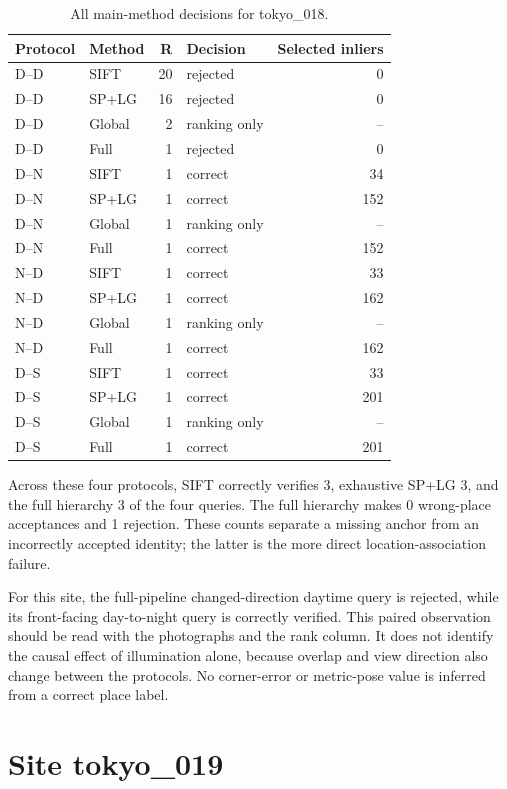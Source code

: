 \begin{table}[H]\centering\small
\caption{All main-method decisions for tokyo\_018.}\label{tab:tokyo-site-18}
\begin{tabular}{llrlr}\toprule
Protocol & Method & R & Decision & Selected inliers \\
\midrule
D--D & SIFT & 20 & rejected & 0 \\
D--D & SP+LG & 16 & rejected & 0 \\
D--D & Global & 2 & ranking only & -- \\
D--D & Full & 1 & rejected & 0 \\
D--N & SIFT & 1 & correct & 34 \\
D--N & SP+LG & 1 & correct & 152 \\
D--N & Global & 1 & ranking only & -- \\
D--N & Full & 1 & correct & 152 \\
N--D & SIFT & 1 & correct & 33 \\
N--D & SP+LG & 1 & correct & 162 \\
N--D & Global & 1 & ranking only & -- \\
N--D & Full & 1 & correct & 162 \\
D--S & SIFT & 1 & correct & 33 \\
D--S & SP+LG & 1 & correct & 201 \\
D--S & Global & 1 & ranking only & -- \\
D--S & Full & 1 & correct & 201 \\
\bottomrule\end{tabular}\end{table}


Across these four protocols, SIFT correctly verifies 3, exhaustive SP+LG 3, and the full hierarchy 3 of the four queries. The full hierarchy makes 0 wrong-place acceptances and 1 rejection. These counts separate a missing anchor from an incorrectly accepted identity; the latter is the more direct location-association failure.

For this site, the full-pipeline changed-direction daytime query is rejected, while its front-facing day-to-night query is correctly verified. This paired observation should be read with the photographs and the rank column. It does not identify the causal effect of illumination alone, because overlap and view direction also change between the protocols. No corner-error or metric-pose value is inferred from a correct place label.

\section{Site tokyo\_019}

